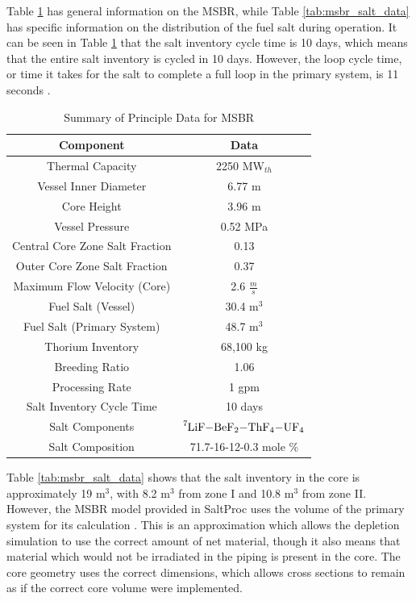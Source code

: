 Table \ref{tab:msbr_gen_data} has general information on the MSBR, while Table \ref{tab:msbr_salt_data} has specific information on the distribution of the fuel salt during operation. It can be seen in Table \ref{tab:msbr_gen_data} that the salt inventory cycle time is 10 days, which means that the entire salt inventory is cycled in 10 days. However, the loop cycle time, or time it takes for the salt to complete a full loop in the primary system, is 11 seconds \cite{robertson_conceptual_1971}.

\begin{table}[H]
\renewcommand{\arraystretch}{1.25}
\caption{Summary of Principle Data for MSBR \cite{robertson_conceptual_1971}}
\label{tab:msbr_gen_data}
\begin{center}
\begin{tabular}{ | c | c | }
 \hline
 Component & Data\\
 \hline
 \hline
 Thermal Capacity & 2250 MW$_{th}$\\
 Vessel Inner Diameter & 6.77 m\\
 Core Height & 3.96 m\\
 Vessel Pressure & 0.52 MPa\\
 Central Core Zone Salt Fraction & 0.13\\
 Outer Core Zone Salt Fraction & 0.37\\
 Maximum Flow Velocity (Core) & 2.6 $\frac{m}{s}$\\
 Fuel Salt (Vessel) & 30.4 m$^3$\\
 Fuel Salt (Primary System) & 48.7 m$^3$\\
 Thorium Inventory & 68,100 kg\\
 Breeding Ratio & 1.06\\
 Processing Rate & 1 gpm\\
 Salt Inventory Cycle Time & 10 days\\
 Salt Components & $\ce{^{7}LiF-BeF_{2}-ThF_{4}-UF_{4}} $\\
 Salt Composition & 71.7-16-12-0.3 mole \% \\
 \hline
\end{tabular}
\end{center}
\end{table}

Table \ref{tab:msbr_salt_data} shows that the salt inventory in the core is approximately 19 m$^3$, with 8.2 m$^3$ from zone I and 10.8 m$^3$ from zone II.
However, the MSBR model provided in SaltProc uses the volume of the primary system for its calculation \cite{rykhlevskii_modeling_2019}. This is an approximation which allows the depletion simulation to use the correct amount of net material, though it also means that material which would not be irradiated in the piping is present in the core. The core geometry uses the correct dimensions, which allows cross sections to remain as if the correct core volume were implemented.


